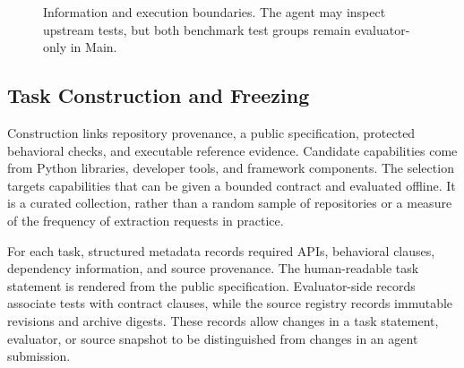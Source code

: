 \documentclass[acmsmall,screen,review,anonymous]{acmart}
\begin{document}
\begin{figure}[t]
 \centering
 \caption{Information and execution boundaries. The agent may inspect upstream
 tests, but both benchmark test groups remain evaluator-only in Main.}
 \label{fig:pipeline}
\end{figure}

\subsection{Task Construction and Freezing}
\label{sec:construction}

Construction links repository provenance, a public specification, protected
behavioral checks, and executable reference evidence. Candidate capabilities
come from Python libraries, developer tools, and framework components. The
selection targets capabilities that can be given a bounded contract and evaluated
offline. It is a curated collection, rather than a random sample of repositories
or a measure of the frequency of extraction requests in practice.

For each task, structured metadata records required APIs, behavioral clauses,
dependency information, and source provenance. The human-readable task statement
is rendered from the public specification. Evaluator-side records associate tests
with contract clauses, while the source registry records immutable revisions and
archive digests. These records allow changes in a task statement, evaluator, or
source snapshot to be distinguished from changes in an agent submission.
\end{document}

